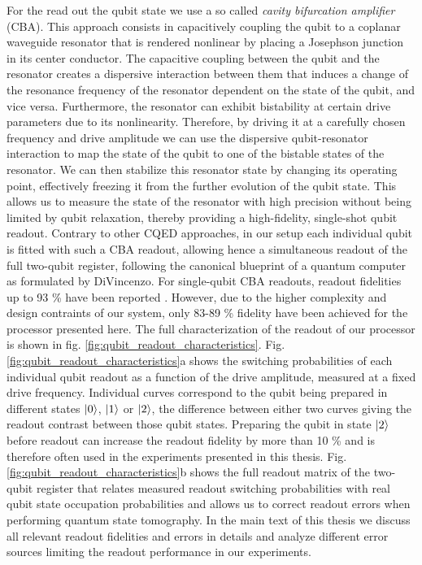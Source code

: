 For the read out the qubit state we use a so called {\it cavity bifurcation amplifier} (CBA). This approach consists in capacitively coupling the qubit to a coplanar waveguide resonator that is rendered nonlinear by placing a Josephson junction in its center conductor. The capacitive coupling between the qubit and the resonator creates a dispersive interaction between them that induces a change of the resonance frequency of the resonator dependent on the state of the qubit, and vice versa. Furthermore, the resonator can exhibit bistability at certain drive parameters due to its nonlinearity. Therefore, by driving it at a carefully chosen frequency and drive amplitude we can use the dispersive qubit-resonator interaction to map the state of the qubit to one of the bistable states of the resonator. We can then stabilize this resonator state by changing its operating point, effectively freezing it from the further evolution of the qubit state. This allows us to measure the state of the resonator with high precision without being limited by qubit relaxation, thereby providing a high-fidelity, single-shot qubit readout. Contrary to other CQED approaches, in our setup each individual qubit is fitted with such a CBA readout, allowing hence a simultaneous readout of the full two-qubit register, following the canonical blueprint of a quantum computer as formulated by DiVincenzo. For single-qubit CBA readouts, readout fidelities up to 93 \% have been reported \citep{mallet_single-shot_2009}. However, due to the higher complexity and design contraints of our system, only  83-89 \% fidelity have been achieved for the processor presented here. The full characterization of the readout of our processor is shown in fig. \ref{fig:qubit_readout_characteristics}. Fig. \ref{fig:qubit_readout_characteristics}a shows the switching probabilities of each individual qubit readout as a function of the drive amplitude, measured at a fixed drive frequency. Individual curves correspond to the qubit being prepared in different states $\left| 0 \right>$, $\left| 1 \right>$ or $\left| 2 \right>$, the difference between either two curves giving the readout contrast between those qubit states. Preparing the qubit in state $\left| 2 \right>$ before readout can increase the readout fidelity by more than 10 \% and is therefore often used in the experiments presented in this thesis. Fig. \ref{fig:qubit_readout_characteristics}b shows the full readout matrix of the two-qubit register that relates measured readout switching probabilities with real qubit state occupation probabilities and allows us to correct readout errors when performing quantum state tomography. In the main text of this thesis we discuss all relevant readout fidelities and errors in details and analyze different error sources limiting the readout performance in our experiments.

